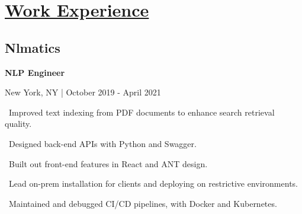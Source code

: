 \documentclass{article}
\begin{document}
\begin{minipage}[t]{0.45\textwidth\hspace{0in}}

    \section{\underline{Work Experience}}
        \vspace{-0.8em}
        \subsection{Nlmatics}
        \vspace{-0.5em}\hspace{0.1em}
        \mdseries\bfseries{NLP Engineer}
        \vspace{0.1em}
        
        \hspace{0.5em}\mdseries\textrm{New York, NY | October 2019 - April 2021}

        \vspace{-0.8em}
        \begin{minipage}[t]{3.75in\textwidth\hspace{0in}}
            \vspace{0.3em}
            \hspace{1em}\textasteriskcentered \, \mdseries\textrm{Improved text indexing from PDF documents to enhance search retrieval quality.}
            
            \vspace{0.3em}
            \hspace{1em}\textasteriskcentered \, \mdseries\textrm{Designed back-end APIs with Python and Swagger.}

            \vspace{0.3em}
            \hspace{1em}\textasteriskcentered \, \mdseries\textrm{Built out front-end features in React and ANT design.}
            
            \vspace{0.3em}
            \hspace{1em}\textasteriskcentered \, \mdseries\textrm{Lead on-prem installation for clients and deploying on restrictive environments.}
            
            \vspace{0.3em}
            \hspace{1em}\textasteriskcentered \, \mdseries\textrm{Maintained and debugged CI/CD pipelines, with Docker and Kubernetes.}
        \end{minipage}


\end{minipage}
\end{document}

